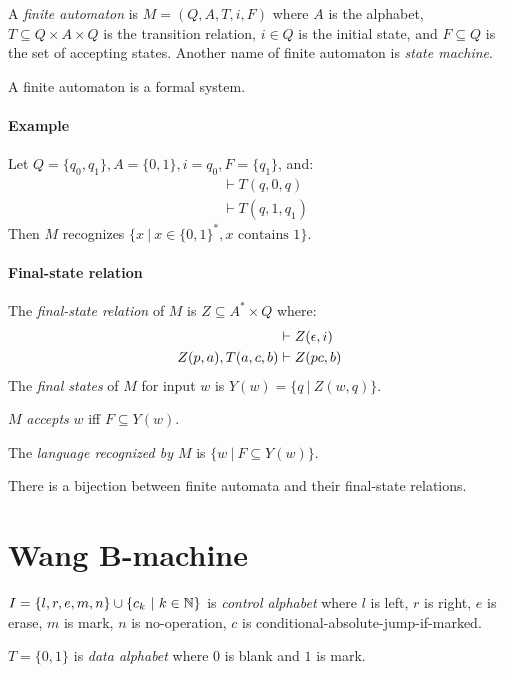 A
%
\emph{finite automaton} is \(M = (Q,A,T,i,F)\) where
\(A\) is the alphabet,
\(T \subseteq Q \times A \times Q\) is the transition relation,
\(i \in Q\) is the initial state,
and \(F \subseteq Q\) is the set of accepting states.
Another name of finite automaton is
%
\emph{state machine}.

A finite automaton is a formal system.

\paragraph{Example}
Let \(Q = \{q_0,q_1\}, A = \{0,1\}, i = q_0, F = \{q_1\}\), and:
\begin{align*}
    &\vdash T(q,0,q)
    \\
    &\vdash T(q,1,q_1)
\end{align*}
Then \(M\) recognizes \(\{ x ~|~ x \in \{0,1\}^*, x \text{ contains 1}\}\).

\paragraph{Final-state relation}
The \emph{final-state relation} of \(M\) is \(Z \subseteq A^* \times Q\) where:
\begin{align*}
    &\vdash Z(\epsilon,i)
    \\
    Z(p,a), T(a,c,b) &\vdash Z(pc,b)
\end{align*}
The \emph{final states} of \(M\) for input \(w\) is \(Y(w) = \{ q ~|~ Z(w,q) \}\).

\(M\) \emph{accepts} \(w\) iff \(F \subseteq Y(w)\).

The \emph{language recognized by \(M\)} is \(\{ w ~|~ F \subseteq Y(w) \}\).

There is a bijection between finite automata and their final-state relations.

\section{Wang B-machine}

\(I = \{ l,r,e,m,n \} \cup \{ c_k ~|~ k \in \mathbb{N} \}\) is \emph{control alphabet}
where \(l\) is left, \(r\) is right, \(e\) is erase,
\(m\) is mark, \(n\) is no-operation,
\(c\) is conditional-absolute-jump-if-marked.

\(T = \{0,1\}\) is \emph{data alphabet} where \(0\) is blank and \(1\) is mark.

